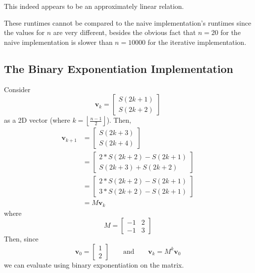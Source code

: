 \documentclass[12pt]{article}
\begin{document}
    This indeed appears to be an approximately linear relation.

    These runtimes cannot be compared to the naive implementation's runtimes
    since the values for $n$ are very different,
    besides the obvious fact that $n = 20$ for the naive implementation
    is slower than $n = 10000$ for the iterative implementation.


    \subsection*{The Binary Exponentiation Implementation}

    Consider
    \[
        \mathbf{v}_k =
        \begin{bmatrix}
            S(2k + 1) \\
            S(2k + 2)
        \end{bmatrix}
    \]
    as a 2D vector (where $k = \left\lfloor \frac{n - 1}{2} \right\rfloor$).
    Then,
    \begin{align*}
        \mathbf{v}_{k + 1} &=
        \begin{bmatrix}
            S(2k + 3) \\
            S(2k + 4)
        \end{bmatrix}
        \\
        &=
        \begin{bmatrix}
            2 * S(2k + 2) - S(2k + 1) \\
            S(2k + 3) + S(2k + 2)
        \end{bmatrix}
        \\
        &=
        \begin{bmatrix}
            2 * S(2k + 2) - S(2k + 1) \\
            3 * S(2k + 2) - S(2k + 1)
        \end{bmatrix}
        \\
        &= M \mathbf{v}_k
    \end{align*}
    where
    \[
        M =
        \begin{bmatrix}
            -1 & 2 \\
            -1 & 3
        \end{bmatrix}
    \]
    Then, since
    \[
        \mathbf{v}_0 =
        \begin{bmatrix}
            1 \\
            2
        \end{bmatrix}
        \qquad
        \text{and}
        \qquad
        \mathbf{v}_k = M^k \mathbf{v}_0
    \]
    we can evaluate using binary exponentiation on the matrix.
\end{document}
